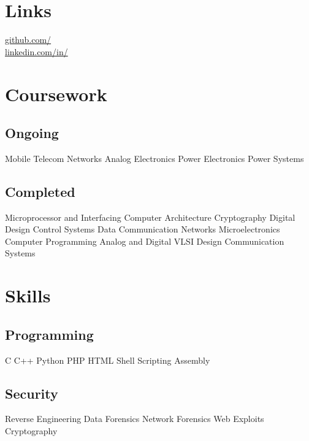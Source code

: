 \documentclass[]{illustris-resume-openfont}
\begin{document}
\begin{minipage}[t]{0.33\textwidth}
\section{Links} 
\href{https://github.com/illustris}{github.com/} \\
\href{https://linkedin.com/in/illustris/}{linkedin.com/in/} \\


\section{Coursework}

\subsection{Ongoing}
Mobile Telecom Networks \textbullet{} Analog Electronics \textbullet{} 
Power Electronics \textbullet{} Power Systems
\sectionsep

\subsection{Completed}
Microprocessor and Interfacing \textbullet{} Computer Architecture \textbullet{} Cryptography \textbullet{} Digital Design \textbullet{} Control Systems \textbullet{} Data Communication Networks \textbullet{} Microelectronics \textbullet{} Computer Programming \textbullet{} Analog and Digital VLSI Design \textbullet{} Communication Systems
\sectionsep


\section{Skills}
\subsection{Programming}
C \textbullet{} C++ \textbullet{} Python \textbullet{} PHP \textbullet{} HTML \textbullet{} Shell Scripting \textbullet{} Assembly
\sectionsep

\subsection{Security}
Reverse Engineering \textbullet{} Data Forensics \textbullet{} Network Forensics \textbullet{} Web Exploits \textbullet{} Cryptography
\sectionsep

%
%

\end{minipage} 
\end{document}
